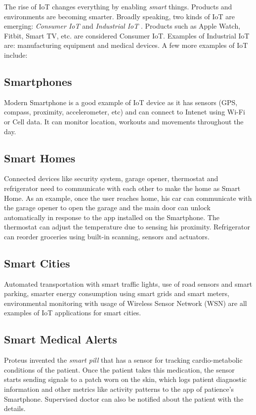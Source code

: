 \documentclass[sigconf]{acmart}
\begin{document}
	The rise of IoT changes everything by enabling {\em smart} things. Products and environments are becoming smarter. Broadly speaking, two kinds of IoT are emerging: {\em Consumer IoT} and {\em Industrial IoT} \cite{iot}. Products such as Apple Watch, Fitbit, Smart TV, etc. are considered Consumer IoT. Examples of Industrial IoT are: manufacturing equipment and medical devices. A few more examples of IoT include:
	
	\subsection{Smartphones}
	Modern Smartphone is a good example of IoT device as it has sensors (GPS, compass, proximity, accelerometer, etc) and can connect to Intenet using Wi-Fi or Cell data. It can monitor location, workouts and movements throughout the day.
	
	\subsection{Smart Homes}
	
	Connected devices like security system, garage opener, thermostat and refrigerator need to communicate with each other to make the home as Smart Home. As an example, once the user reaches home, his car can communicate with the garage opener to open the garage and the main door can unlock automatically in response to the app installed on the Smartphone. The thermostat can adjust the temperature due to sensing his proximity. Refrigerator can reorder groceries using built-in scanning, sensors and actuators. 	
	
	\subsection{Smart Cities}
	
	Automated transportation with smart traffic lights, use of road sensors and smart parking, smarter energy consumption using smart grids and smart meters, environmental monitoring with usage of Wireless Sensor Network (WSN) are all examples of IoT applications for smart cities.
	
	\subsection{Smart Medical Alerts}
	
	Proteus invented the {\em smart pill} that has a sensor for tracking cardio-metabolic conditions of the patient. Once the patient takes this medication, the sensor starts sending signals to a patch worn on the skin, which logs patient diagnostic information and other metrics like activity patterns to the app of patience's Smartphone. Supervised doctor can also be notified about the patient with the details\cite{proteus}.
	
\end{document}
